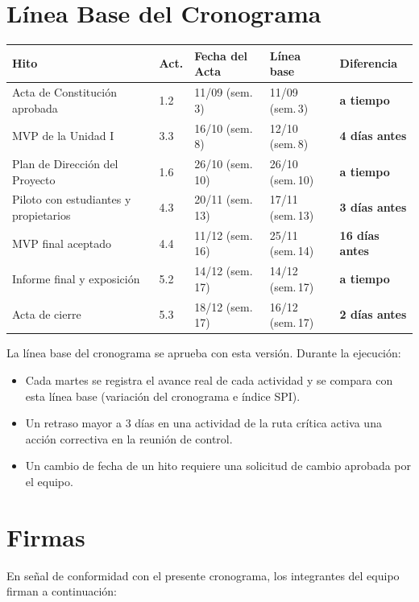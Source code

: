\documentclass[11pt,a4paper]{article}
\begin{document}
\section{Línea Base del Cronograma}
{\small
{}
\noindent\begin{tabularx}{\textwidth}{@{}L C{0.9cm} C{2.75cm} C{2.75cm} C{2.3cm}@{}}
\toprule
{}
\textbf{Hito} & \textbf{Act.} & \textbf{Fecha del Acta} & \textbf{Línea base} & \textbf{Diferencia} \\
\midrule
Acta de Constitución aprobada & 1.2 & 11/09 (sem.\,3) & 11/09 (sem.\,3) & \textcolor{Rama4}{\textbf{a tiempo}} \\
MVP de la Unidad I & 3.3 & 16/10 (sem.\,8) & 12/10 (sem.\,8) & \textcolor{Rama4}{\textbf{4 días antes}} \\
Plan de Dirección del Proyecto & 1.6 & 26/10 (sem.\,10) & 26/10 (sem.\,10) & \textcolor{Rama4}{\textbf{a tiempo}} \\
Piloto con estudiantes y propietarios & 4.3 & 20/11 (sem.\,13) & 17/11 (sem.\,13) & \textcolor{Rama4}{\textbf{3 días antes}} \\
MVP final aceptado & 4.4 & 11/12 (sem.\,16) & 25/11 (sem.\,14) & \textcolor{Rama4}{\textbf{16 días antes}} \\
Informe final y exposición & 5.2 & 14/12 (sem.\,17) & 14/12 (sem.\,17) & \textcolor{Rama4}{\textbf{a tiempo}} \\
Acta de cierre & 5.3 & 18/12 (sem.\,17) & 16/12 (sem.\,17) & \textcolor{Rama4}{\textbf{2 días antes}} \\
\bottomrule
\end{tabularx}
}

\vspace{0.2cm}
\noindent La línea base del cronograma se aprueba con esta versión. Durante la ejecución:
\begin{itemize}[leftmargin=*]
    \item Cada martes se registra el avance real de cada actividad y se compara con esta línea base (variación del cronograma e índice SPI).
    \item Un retraso mayor a 3 días en una actividad de la ruta crítica activa una acción correctiva en la reunión de control.
    \item Un cambio de fecha de un hito requiere una solicitud de cambio aprobada por el equipo.
\end{itemize}

\section{Firmas}
\noindent En señal de conformidad con el presente cronograma, los integrantes del equipo firman a continuación:
\end{document}
